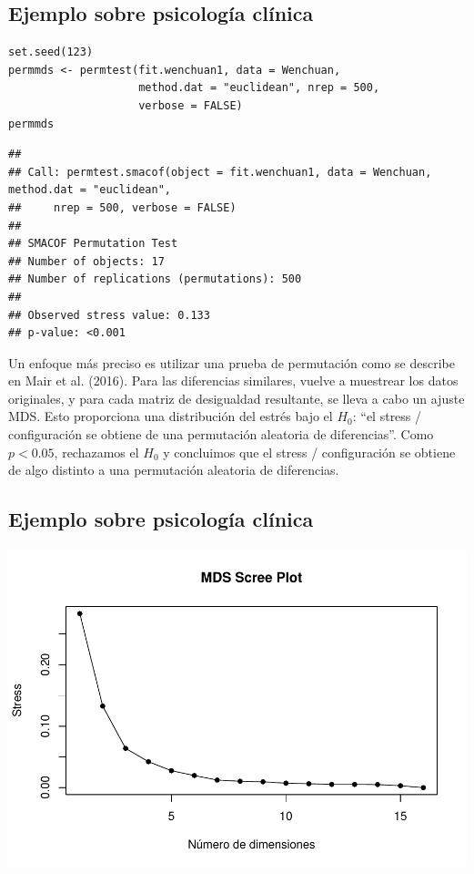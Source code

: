 \documentclass[]{article}
\begin{document}
\subsection{Ejemplo sobre psicología
clínica}\label{ejemplo-sobre-psicologuxeda-cluxednica-7}

\hypertarget{left}{}
\begin{verbatim}
set.seed(123)
permmds <- permtest(fit.wenchuan1, data = Wenchuan,
                    method.dat = "euclidean", nrep = 500,
                    verbose = FALSE)
permmds
\end{verbatim}

\begin{verbatim}
## 
## Call: permtest.smacof(object = fit.wenchuan1, data = Wenchuan, method.dat = "euclidean", 
##     nrep = 500, verbose = FALSE)
## 
## SMACOF Permutation Test
## Number of objects: 17 
## Number of replications (permutations): 500 
## 
## Observed stress value: 0.133 
## p-value: <0.001
\end{verbatim}

\hypertarget{right}{}
Un enfoque más preciso es utilizar una prueba de permutación como se
describe en Mair et al. (2016). Para las diferencias similares, vuelve a
muestrear los datos originales, y para cada matriz de desigualdad
resultante, se lleva a cabo un ajuste MDS. Esto proporciona una
distribución del estrés bajo el \(H_0\): ``el stress / configuración se
obtiene de una permutación aleatoria de diferencias''. Como \(p<0.05\),
rechazamos el \(H_0\) y concluimos que el stress / configuración se
obtiene de algo distinto a una permutación aleatoria de diferencias.

\subsection{Ejemplo sobre psicología
clínica}\label{ejemplo-sobre-psicologuxeda-cluxednica-8}

\hypertarget{left}{}
\includegraphics{Clase-4_files/figure-latex/unnamed-chunk-33-1.pdf}
\end{document}
